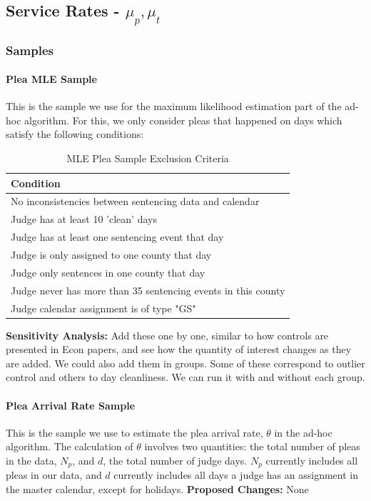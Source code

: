 \documentclass[11pt]{article}
\theoremstyle{ModifiedStyle}
\theoremstyle{ModifiedStyle}
\begin{document}
  \subsection{Service Rates - $\mu_p,\mu_t$}
    \subsubsection{Samples}
      \paragraph{Plea MLE Sample} This is the sample we use for the maximum likelihood estimation part of the ad-hoc algorithm. For this, we only consider pleas that happened on days which satisfy the following conditions:
        \begin{table}[H]
          \centering
          \caption{MLE Plea Sample Exclusion Criteria}
          \begin{tabular}{|l|}
          \hline
          \textbf{Condition}                                                  \\ \hline
          No inconsistencies between sentencing data and calendar \\ \hline
          Judge has at least 10 'clean' days                      \\ \hline
          Judge has at least one sentencing event that day         \\ \hline
          Judge is only assigned to one county that day          \\ \hline
          Judge only sentences in one county that day             \\ \hline
          Judge never has more than 35 sentencing events in this county \\ \hline
          Judge calendar assignment is of type "GS"           \\ \hline
          \end{tabular}
        \end{table}
      \textbf{Sensitivity Analysis:} Add these one by one, similar to how controls are presented in Econ papers, and see how the quantity of interest changes as they are added. We could also add them in groups. Some of these correspond to outlier control and others to day cleanliness. We can run it with and without each group.

      \paragraph{Plea Arrival Rate Sample} This is the sample we use to estimate the plea arrival rate, $\theta$ in the ad-hoc algorithm. The calculation of $\theta$ involves two quantities: the total number of pleas in the data, $N_p$, and $d$, the total number of judge days. $N_p$ currently includes all pleas in our data, and $d$ currently includes all days a judge has an assignment in the master calendar, except for holidays. \textbf{Proposed Changes:} None
\end{document}
